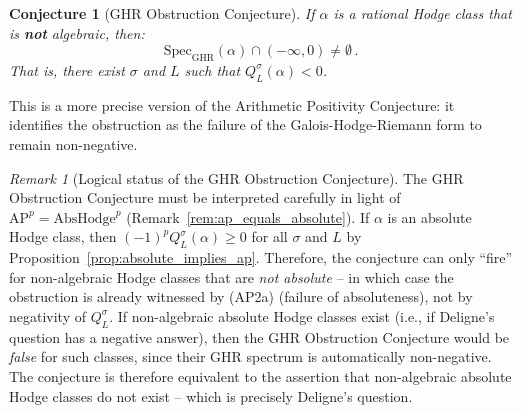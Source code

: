 \documentclass[aps,prd,twocolumn,superscriptaddress,nofootinbib]{revtex4-2}
\newtheorem{conjecture}[theorem]{Conjecture}
\theoremstyle{definition}
\theoremstyle{remark}
\newtheorem{remark}[theorem]{Remark}
\begin{document}
\begin{conjecture}[GHR Obstruction Conjecture]
\label{conj:ghr}
If $\alpha$ is a rational Hodge class that is \textbf{not} algebraic, then:
\begin{equation}
\mathrm{Spec}_{\mathrm{GHR}}(\alpha) \cap (-\infty, 0) \neq \emptyset\,.
\end{equation}
That is, there exist $\sigma$ and $L$ such that $Q_L^\sigma(\alpha) < 0$.
\end{conjecture}

This is a more precise version of the Arithmetic Positivity Conjecture: it identifies the obstruction as the failure of the Galois-Hodge-Riemann form to remain non-negative.

\begin{remark}[Logical status of the GHR Obstruction Conjecture]
\label{rem:ghr_status}
The GHR Obstruction Conjecture must be interpreted carefully in light of $\mathrm{AP}^p = \mathrm{AbsHodge}^p$ (Remark~\ref{rem:ap_equals_absolute}). If $\alpha$ is an absolute Hodge class, then $(-1)^p Q_L^\sigma(\alpha) \geq 0$ for all $\sigma$ and $L$ by Proposition~\ref{prop:absolute_implies_ap}. Therefore, the conjecture can only ``fire'' for non-algebraic Hodge classes that are \textit{not absolute} -- in which case the obstruction is already witnessed by (AP2a) (failure of absoluteness), not by negativity of $Q_L^\sigma$. If non-algebraic absolute Hodge classes exist (i.e., if Deligne's question has a negative answer), then the GHR Obstruction Conjecture would be \textit{false} for such classes, since their GHR spectrum is automatically non-negative. The conjecture is therefore equivalent to the assertion that non-algebraic absolute Hodge classes do not exist -- which is precisely Deligne's question.
\end{remark}
\end{document}
